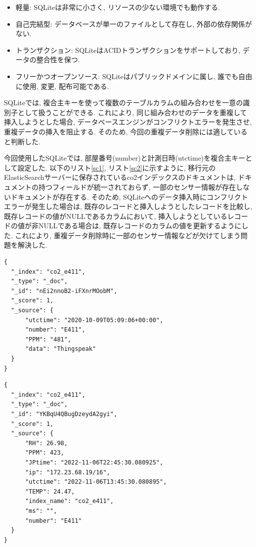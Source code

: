 \begin{itemize}
  \item 軽量: SQLiteは非常に小さく, リソースの少ない環境でも動作する.
  \item 自己完結型: データベースが単一のファイルとして存在し, 外部の依存関係がない.
  \item 
        トランザクション: SQLiteはACIDトランザクションをサポートしており, データの整合性を保つ. 
  \item 
        フリーかつオープンソース: SQLiteはパブリックドメインに属し, 誰でも自由に使用, 変更, 配布可能である.
\end{itemize}

SQLiteでは, 複合主キーを使って複数のテーブルカラムの組み合わせを一意の識別子として扱うことができる. これにより, 同じ組み合わせのデータを重複して挿入しようとした場合, データベースエンジンがコンフリクトエラーを発生させ, 重複データの挿入を阻止する. そのため, 今回の重複データ削除には適していると判断した.

今回使用したSQLiteでは, 部屋番号(number)と計測日時(utctime)を複合主キーとして設定した. 以下のリスト\ref{sc1}, リスト\ref{sc2}に示すように, 移行元のElasticSearchサーバーに保存されているco2インデックスのドキュメントは, ドキュメントの持つフィールドが統一されておらず, 一部のセンサー情報が存在しないドキュメントが存在する. そのため, SQLiteへのデータ挿入時にコンフリクトエラーが発生した場合は, 既存のレコードと挿入しようとしたレコードを比較し, 既存レコードの値がNULLであるカラムにおいて, 挿入しようとしているレコードの値が非NULLである場合は, 既存レコードのカラムの値を更新するようにした. これにより, 重複データ削除時に一部のセンサー情報などが欠けてしまう問題を解決した.

\begin{lstlisting}[caption=\_sourceフィールドのメンバー数が少ないドキュメント, label=sc1]
{
  "_index": "co2_e411",
  "_type": "_doc",
  "_id": "nEi2nnoB2-iFXnrMOobM",
  "_score": 1,
  "_source": {
      "utctime": "2020-10-09T05:09:06+00:00",
      "number": "E411",
      "PPM": "481",
      "data": "Thingspeak"
  }
}
  \end{lstlisting}

\begin{lstlisting}[caption=\_sourceフィールドのメンバー数が多いドキュメント, label=sc2]
{
  "_index": "co2_e411",
  "_type": "_doc",
  "_id": "YKBqU4QBugDzeydA2gyi",
  "_score": 1,
  "_source": {
      "RH": 26.98,
      "PPM": 423,
      "JPtime": "2022-11-06T22:45:30.080925",
      "ip": "172.23.68.19/16",
      "utctime": "2022-11-06T13:45:30.080895",
      "TEMP": 24.47,
      "index_name": "co2_e411",
      "ms": "",
      "number": "E411"
  }
}
    \end{lstlisting}

